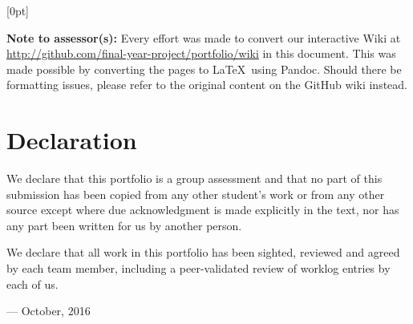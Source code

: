 %
%
\def \unitcode      {SWE40002}
\def \unitname      {Software Engineering Project B}


\usepackage{titletoc}
\linespread{1.5}

  [0pt]%
  {}%
  {\chaptername\ \thecontentslabel\quad}%
  {}%
  {\rmfamily \hfill\contentspage\\}%



\titlepagehere
\cleartoleftpage

\noindent
\textbf{Note to assessor(s):} Every effort was made to convert our interactive Wiki
at \url{http://github.com/final-year-project/portfolio/wiki} in this document.
This was made possible by converting the pages to \LaTeX\ using Pandoc. Should there
be formatting issues, please refer to the original content on the GitHub wiki instead.

\cleartoleftpage

\section*{Declaration}

We declare that this portfolio is a group assessment and that no part of this
submission has been copied from any other student's work or from any other
source except where due acknowledgment is made explicitly in the text, nor has
any part been written for us by another person.

We declare that all work in this portfolio has been sighted, reviewed and agreed
by each team member, including a peer-validated review of worklog entries by
each of us.

\hfill --- October, 2016

\vspace{5em}

